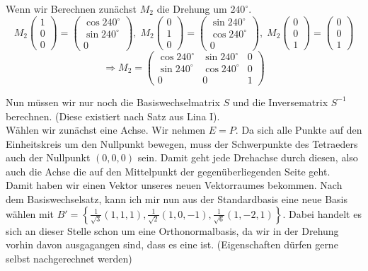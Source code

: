 \documentclass[11pt,a4paper,ngerman]{article}
\begin{document}
\begin{enumerate}[\bfseries (a)]
Wenn wir Berechnen zunächst $M_2$ die Drehung um $240^\circ$.\\
$$
M_2 \left( \begin{array}{c} 1 \\ 0 \\ 0 \end{array} \right) = \left( \begin{array}{c} \cos 240^\circ \\ \sin 240^\circ \\ 0 \end{array} \right), \; M_2 \left( \begin{array}{c} 0 \\ 1 \\ 0 \end{array} \right) = \left( \begin{array}{c} \sin 240^\circ \\ \cos 240^\circ \\ 0 \end{array} \right), \; M_2 \left( \begin{array}{c} 0 \\ 0 \\ 1 \end{array} \right) = \left( \begin{array}{c} 0 \\ 0 \\ 1 \end{array} \right)
$$
$$
\Rightarrow M_2 = \left(
\begin{array}{ccc}
\cos 240^\circ & \sin 240^\circ & 0 \\
\sin 240^\circ & \cos 240^\circ & 0 \\
0 & 0 & 1
\end{array} \right)
$$

Nun müssen wir nur noch die Basiswechselmatrix $S$ und die Inversematrix $S^{-1}$ berechnen. (Diese existiert nach Satz aus Lina I).\\

Wählen wir zunächst eine Achse. Wir nehmen $E = P$. Da sich alle Punkte auf den Einheitskreis um den Nullpunkt bewegen, muss der Schwerpunkte des Tetraeders auch der Nullpunkt $( 0 , 0 ,0 )$ sein. Damit geht jede Drehachse durch diesen, also auch die Achse die auf den Mittelpunkt der gegenüberliegenden Seite geht.\\

Damit haben wir einen Vektor unseres neuen Vektorraumes bekommen. Nach dem Basiswechselsatz, kann ich mir nun aus der Standardbasis eine neue Basis wählen mit $B' = \left\{ \frac{1}{\sqrt{3}}(1,1,1), \frac{1}{\sqrt{2}}(1,0,-1), \frac{1}{\sqrt{6}}(1,-2,1) \right\}$. Dabei handelt es sich an dieser Stelle schon um eine Orthonormalbasis, da wir in der Drehung vorhin davon ausgagangen sind, dass es eine ist. (Eigenschaften dürfen gerne selbst nachgerechnet werden)\\


\end{enumerate}
\end{document}
